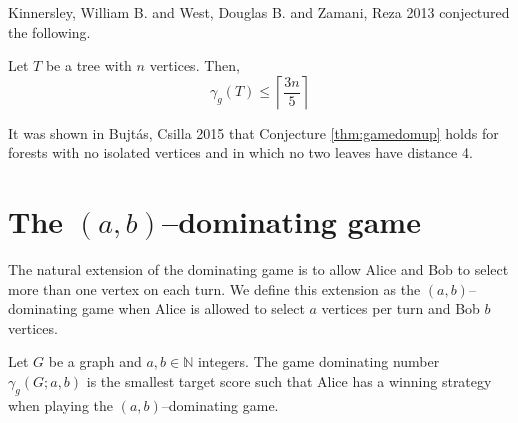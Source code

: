 Kinnersley, William B. and West, Douglas B. and Zamani, Reza 2013 \cite{KiWeZa2013} conjectured the following. 
\begin{conjecture} \label{thm:treedomup}
    Let $T$ be a tree with $n$ vertices. Then,    
    \[ \gamma_g(T) \leq \left\lceil \frac{3n}{5} \right\rceil\]
\end{conjecture}
 It was shown in Bujt\'{a}s, Csilla 2015 that Conjecture \ref{thm:gamedomup} holds for forests with no isolated vertices and in which no two leaves have distance 4.
%
%    
%        
%    
%   
%       

\section{The $(a,b)$--dominating game}

The natural extension of the dominating game is to allow Alice and Bob to select more than one vertex on each turn. We define this extension as the $(a,b)$--dominating game when Alice is allowed to select $a$ vertices per turn and Bob $b$ vertices.

\begin{definition}
    Let $G$ be a graph and $a,b\in\mathbb{N}$ integers. The game dominating number $\gamma_g(G;a,b)$ is the smallest target score such that Alice has a winning strategy when playing the $(a,b)$--dominating game.
\end{definition}

